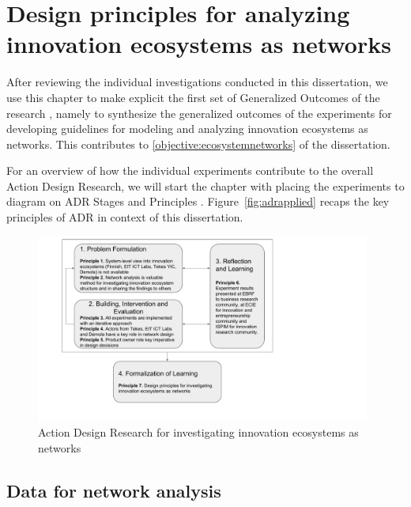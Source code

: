 \chapter{Design principles for analyzing innovation ecosystems as networks}
\label{ch:ecosystemnetworks}

After reviewing the individual investigations conducted in this dissertation, we use this chapter to make explicit the first set of Generalized Outcomes of the research \citep{Sein2011ActionResearch}, namely to synthesize the generalized outcomes of the experiments for developing guidelines for modeling and analyzing innovation ecosystems as networks. This contributes to \ref{objective:ecosystemnetworks} of the dissertation.

For an overview of how the individual experiments contribute to the overall Action Design Research, we will start the chapter with placing the experiments to diagram on ADR Stages and Principles \citep{Sein2011ActionResearch}. Figure~\ref{fig:adrapplied} recaps the key principles of ADR in context of this dissertation.

\begin{figure}[htb]
\centering
\includegraphics[width=11cm]{diagram/ADR-innovation-ecosystems-as-networks.pdf}
\caption{Action Design Research for investigating innovation ecosystems as networks \citep[following][]{Sein2011ActionResearch}\label{fig:adrapplied}}
\label{fig:ADR-innovation-ecosystems-as-networks}
\end{figure}

\section{Data for network analysis}
\label{sec:networkdata}

